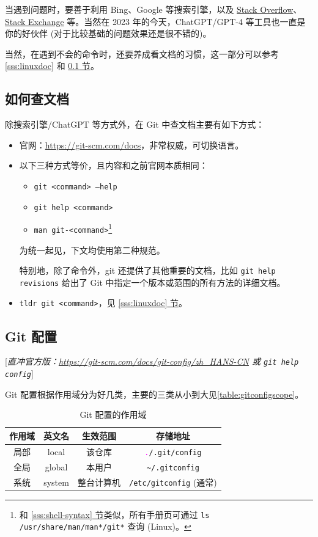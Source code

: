 \documentclass{article}
\begin{document}
	当遇到问题时，要善于利用 Bing、Google 等搜索引擎，以及 \href{https://stackoverflow.com/}{Stack Overflow}、\href{https://stackexchange.com/}{Stack Exchange} 等。当然在 2023 年的今天，ChatGPT/GPT-4 等工具也一直是你的好伙伴 (对于比较基础的问题效果还是很不错的)。

	当然，在遇到不会的命令时，还要养成看文档的习惯，这一部分可以参考 \ref{sss:linuxdoc} 和 \hyperref[sss:gitdoc]{\ref*{sss:gitdoc} 节}。

	\subsection{如何查文档}
	\label{sss:gitdoc}

	除搜索引擎/ChatGPT 等方式外，在 Git 中查文档主要有如下方式：
	\begin{itemize}
		\itemsep0pt
		\item 官网：\url{https://git-scm.com/docs}，非常权威，可切换语言。
		\item 以下三种方式等价，且内容和之前官网本质相同：
			\begin{itemize}
				\itemsep0pt
				\item \texttt{git <command> --help}
				\color{red}\item \texttt{git help <command>}\normalcolor
				\item \texttt{man git-<command>}\footnote{和 \hyperref[sss:shell-syntax]{\ref*{sss:shell-syntax} 节}类似，所有手册页可通过 \texttt{ls /usr/share/man/man*/git*} 查询 (Linux)。}
			\end{itemize}
			为统一起见，下文均使用第二种规范。

			特别地，除了命令外，git 还提供了其他重要的文档，比如 \texttt{git help revisions} 给出了 Git 中指定一个版本或范围的所有方法的详细文档。
		\item \texttt{tldr git <command>}，见 \hyperref[sss:linuxdoc]{\ref*{sss:linuxdoc} 节}。
	\end{itemize}

	\subsection{Git 配置}
	\label{sss:gitconfig}

	\textcolor{properpurple}{[\textit{直冲官方版：\url{https://git-scm.com/docs/git-config/zh_HANS-CN} 或 \texttt{git help config}}]}

	Git 配置根据作用域分为好几类，主要的三类从小到大见\autoref{table:gitconfigscope}。

	\begin{table}[htb]
		\centering
		\begin{tabular}{|c|c|c|c|}
			\hline
				作用域 & 英文名 & 生效范围 & 存储地址 \\
			\hline\hline
				局部 & local & 该仓库 & \texttt{\textcolor{fuchsia}.\footnotemark/.git/config} \\
			\hline
				全局 & global & 本用户 & \verb!~/.gitconfig! \\
			\hline
				系统 & system & 整台计算机 & \texttt{/etc/gitconfig} (通常) \\
			\hline
		\end{tabular}
		\caption{Git 配置的作用域}
		\label{table:gitconfigscope}
	\end{table}
\end{document}
